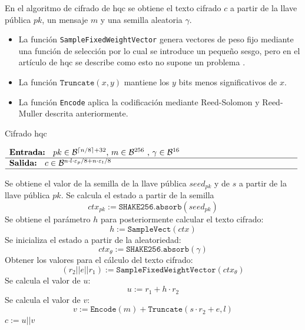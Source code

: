 En el algoritmo de cifrado de \acrshort{hqc} se obtiene el texto cifrado \(c\) a partir de la llave pública \(pk\), un mensaje \(m\) y una semilla aleatoria \(\gamma\).
\begin{itemize}
	\item La función \texttt{SampleFixedWeightVector} genera vectores de peso fijo mediante una función de selección por lo cual se introduce un pequeño sesgo, pero en el artículo de \acrshort{hqc} se describe como esto no supone un problema \cite{hqc2025}.
	\item La función $\texttt{Truncate}(x,y)$ mantiene los \(y\) bits menos significativos de \(x\).
	\item La función \texttt{Encode} aplica la codificación mediante Reed-Solomon y Reed-Muller descrita anteriormente.
\end{itemize}
\newpage
\begin{algorithm}[H]
	\small
	\caption{Cifrado \acrshort{hqc}}
	\label{alg:hqc}
	$\begin{array}{p{\textwidth}}
		\textbf{Entrada: } \(pk\in \mathcal{B}^{\lceil n/8 \rceil+32}\), \(m\in \mathcal{B}^{256}\) , \(\gamma\in \mathcal{B}^{16}\)\\ 
		\hline
		\textbf{Salida: } \(c\in \mathcal{B}^{n\cdot l\cdot \varepsilon_p/8+n\cdot \varepsilon_t/8}\)\\ 
		\hline
	\end{array}$
	\begin{algorithmic}[1]
		\State Se obtiene el valor de la semilla de la llave pública \(seed_{pk}\) y de \(s\) a partir de la llave pública \(pk\).
		\State Se calcula el estado a partir de la semilla
		\begin{equation}
			ctx_{pk}:=\texttt{SHAKE256.absorb}(seed_{pk})
		\end{equation}
		\State Se obtiene el parámetro \(h\) para posteriormente calcular el texto cifrado:
		\begin{equation}
			h:=\texttt{SampleVect}(ctx)
		\end{equation}
		\State Se inicializa el estado a partir de la aleatoriedad:
		\begin{equation}
			ctx_{\theta}:=\texttt{SHAKE256.absorb}(\gamma)
		\end{equation}
		\State Obtener los valores para el cálculo del texto cifrado:
		\begin{equation}
			(r_2||e||r_1):=\texttt{SampleFixedWeightVector}(ctx_{\theta})
		\end{equation}
		\State Se calcula el valor de \(u\):
		\begin{equation}
			u:=r_1+h\cdot r_2
		\end{equation}
		\State Se calcula el valor de \(v\): 
		\begin{equation}
			v:=\texttt{Encode}(m)+\texttt{Truncate}(s\cdot r_2+e,l)
		\end{equation}
		\State \Return $c:=u||v$
	\end{algorithmic}
\end{algorithm}


